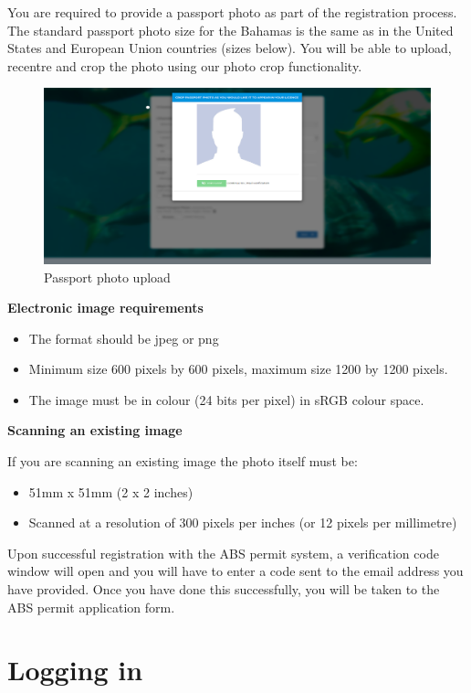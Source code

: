 \documentclass[
]{book}
\providecommand{\tightlist}{%
  \setlength{\itemsep}{0pt}\setlength{\parskip}{0pt}}
\begin{document}
You are required to provide a passport photo as part of the registration process. The standard passport photo size for the Bahamas is the same as in the United States and European Union countries (sizes below). You will be able to upload, recentre and crop the photo using our photo crop functionality.

\begin{figure}
\centering
\includegraphics{images/passport_photo.png}
\caption{Passport photo upload}
\end{figure}

\textbf{Electronic image requirements}

\begin{itemize}
\tightlist
\item
  The format should be jpeg or png
\item
  Minimum size 600 pixels by 600 pixels, maximum size 1200 by 1200 pixels.
\item
  The image must be in colour (24 bits per pixel) in sRGB colour space.
\end{itemize}

\textbf{Scanning an existing image}

If you are scanning an existing image the photo itself must be:

\begin{itemize}
\tightlist
\item
  51mm x 51mm (2 x 2 inches)
\item
  Scanned at a resolution of 300 pixels per inches (or 12 pixels per millimetre)
\end{itemize}

Upon successful registration with the ABS permit system, a verification code window will open and you will have to enter a code sent to the email address you have provided. Once you have done this successfully, you will be taken to the ABS permit application form.

\hypertarget{logging-in}{%
\section{Logging in}\label{logging-in}}
\end{document}
